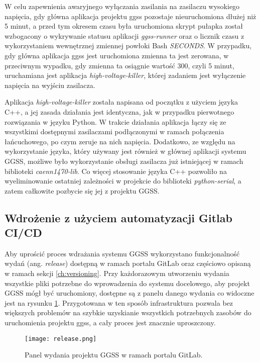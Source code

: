 W celu zapewnienia awaryjnego wyłączania zasilania na zasilaczu wysokiego napięcia, gdy główna aplikacja projektu ggss pozostaje nieuruchomiona dłużej niż 5 minut, a przed tym okresem czasu była uruchomiona skrypt pułapka został wzbogacony o wykrywanie statusu aplikacji \emph{ggss-runner} oraz o licznik czasu z wykorzystaniem wewnętrznej zmiennej powłoki Bash \emph{SECONDS}. W przypadku, gdy główna aplikacja ggss jest uruchomiona zmienna ta jest zerowana, w przeciwnym wypadku, gdy zmienna ta osiągnie wartość 300, czyli 5 minut, uruchamiana jest aplikacja \emph{high-voltage-killer}, której zadaniem jest wyłączenie napięcia na wyjściu zasilacza.

Aplikacja \emph{high-voltage-killer} została napisana od początku z użyciem języka C++, a jej zasada działania jest identyczna, jak w przypadku pierwotnego rozwiązania w języku Python. W trakcie działania aplikacja łączy się ze wszystkimi dostępnymi zasilaczami podłączonymi w ramach połączenia łańcuchowego, po czym zeruje na nich napięcia. Dodatkowo, ze względu na wykorzystanie języka, który używany jest również w głównej aplikacji systemu GGSS, możliwe było wykorzystanie obsługi zasilacza już istniejącej w ramach biblioteki \emph{caenn1470-lib}. Co więcej stosowanie języka C++ pozwoliło na wyeliminowanie ostatniej zależności w projekcie do biblioteki \emph{python-serial}, a zatem całkowite pozbycie się jej z projektu GGSS.

\subsection{Wdrożenie z użyciem automatyzacji Gitlab CI/CD}

Aby uprościć proces wdrażania systemu GGSS wykorzystano funkcjonalność wydań (ang. \emph{release}) dostępną w ramach portalu GitLab oraz częściowo opisaną w ramach sekcji \ref{ch:versioning}. Przy każdorazowym utworzeniu wydania wszystkie pliki potrzebne do wprowadzenia do systemu docelowego, aby projekt GGSS mógł być uruchomiony, dostępne są z panelu danego wydania co widoczne jest na rysunku \ref{fig:release}. Przygotowana w ten sposób infrastruktura pozwala bez większych problemów na szybkie uzyskianie wszystkich potrzebnych zasobów do uruchomienia projektu ggss, a cały proces jest znacznie uproszczony.

\begin{figure}[H]
    \centering
    \texttt{[image: release.png]}
    \caption{Panel wydania projektu GGSS w ramach portalu GitLab.}
    \label{fig:release}
\end{figure}

